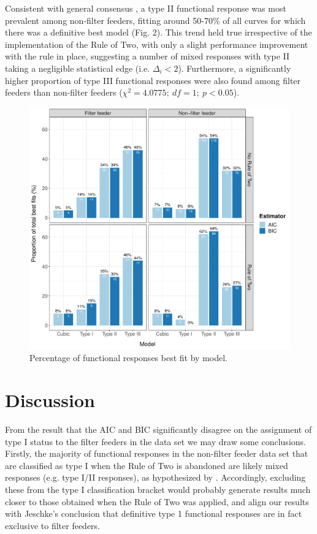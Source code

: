 \documentclass[11pt]{article}
\begin{document}
    Consistent with general consensus \citep{hassell1976components, begon1996ecology}, a type II functional response was most prevalent among non-filter feeders, fitting around 50-70\% of all curves for which there was a definitive best model (Fig. 2). This trend held true irrespective of the implementation of the Rule of Two, with only a slight performance improvement with the rule in place, suggesting a number of mixed responses with type II taking a negligible statistical edge (i.e. $\Delta_i<2$). 
    Furthermore, a significantly higher proportion of type III functional responses were also found among filter feeders than non-filter feeders ($\chi^2=4.0775;\:df=1;\:p<0.05$). 
    
        
    \begin{figure}[t!]
	    \centering\includegraphics[width=1\textwidth]{ModelComparisonBar.pdf}
	    \caption{Percentage of functional responses best fit by model.}
    \end{figure}
   
    
    \section{Discussion}

    From the result that the AIC and BIC significantly disagree on the assignment of type I status to the filter feeders in the data set we may draw some conclusions. Firstly, the majority of functional responses in the non-filter feeder data set that are classified as type I when the Rule of Two is abandoned are likely mixed responses (e.g. type I/II responses), as hypothesized by \citet[p.341]{jeschke2004consumer}. Accordingly, excluding these from the type I classification bracket would probably generate results much closer to those obtained when the Rule of Two was applied, and align our results with Jeschke's conclusion that definitive type 1 functional responses are in fact exclusive to filter feeders.
    
\end{document}

